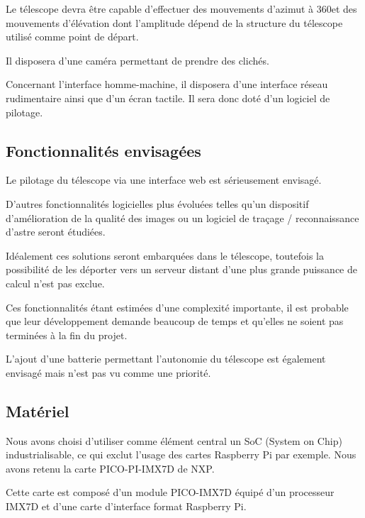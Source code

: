 Le télescope devra être capable d'effectuer des mouvements d'azimut à 360\textdegree et des mouvements d'élévation dont l'amplitude dépend de la structure du télescope utilisé comme point de départ.

\vspace{1cm}

Il disposera d'une caméra permettant de prendre des clichés.

\vspace{1cm}

Concernant l'interface homme-machine, il disposera d'une interface réseau rudimentaire ainsi que d'un écran tactile. Il sera donc doté d'un logiciel de pilotage.

\subsection{Fonctionnalités envisagées}

Le pilotage du télescope via une interface web est sérieusement envisagé.

\vspace{1cm}

D'autres fonctionnalités logicielles plus évoluées telles qu'un dispositif d'amélioration de la qualité des images ou un logiciel de traçage / reconnaissance d'astre seront étudiées.

Idéalement ces solutions seront embarquées dans le télescope, toutefois la possibilité de les déporter vers un serveur distant d'une plus grande puissance de calcul n'est pas exclue.

Ces fonctionnalités étant estimées d'une complexité importante, il est probable que leur développement demande beaucoup de temps et qu'elles ne soient pas terminées à la fin du projet.

\vspace{1cm}

L'ajout d'une batterie permettant l'autonomie du télescope est également envisagé mais n'est pas vu comme une priorité.

\subsection{Matériel}

Nous avons choisi d'utiliser comme élément central un SoC (System on Chip) industrialisable, ce qui exclut l'usage des cartes Raspberry Pi par exemple. Nous avons retenu la carte PICO-PI-IMX7D de NXP.

Cette carte est composé d'un module PICO-IMX7D équipé d'un processeur IMX7D et d'une carte d'interface format Raspberry Pi.

